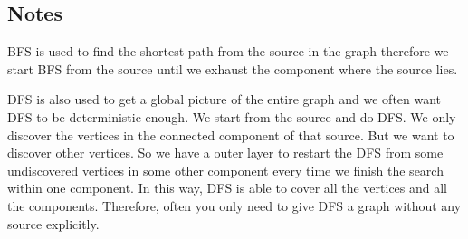 \documentclass[en,hazy,blue,screen,14pt]{elegantnote}
\begin{document}
\subsection{Notes}
BFS is used to find the shortest path from the source in the graph therefore we 
start BFS from the source until we exhaust the component where the source lies.

DFS is also used to get a global picture of the entire graph and we often want 
DFS to be deterministic enough. We start from the source and do DFS. We only 
discover the vertices in the connected component of that source. But we want to 
discover other vertices. So we have a outer layer to restart the DFS from some 
undiscovered vertices in some other component every time we finish the search 
within one component. In this way, DFS is able to cover all the vertices and 
all the components. Therefore, often you only need to give DFS a graph without 
any source explicitly.
\end{document}
